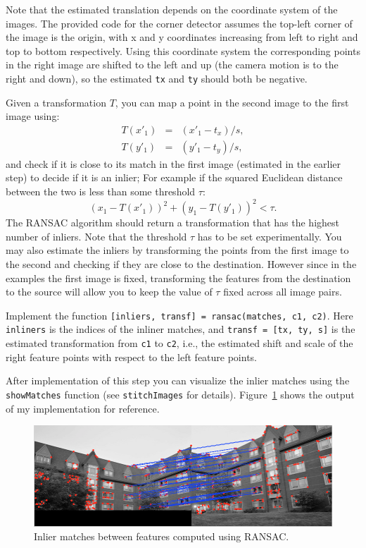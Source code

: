 \documentclass[10pt,letterpaper]{article}
\newcommand{\cmd}[1] {{\color{blue}\texttt{#1}}}
\begin{document}
Note that the estimated translation depends on the coordinate system of the images. The provided code for the corner detector assumes the top-left corner of the image is the origin, with x and y coordinates increasing from left to right and top to bottom respectively. Using this coordinate system the corresponding points in the right image are shifted to the left and up (the camera motion is to the right and down), so the estimated \cmd{tx} and \cmd{ty} should both be negative.

Given a transformation $T$, you can map a point in the second image to the first image using:
\begin{eqnarray}
T(x'_1) &=& (x'_1 - t_x)/s,\\
T(y'_1) &=& (y'_1 - t_y)/s,
\end{eqnarray}
and check if it is close to its match in the first image (estimated in the earlier step) to decide if it is an inlier; For example if the squared Euclidean distance between the two is less than some threshold $\tau$:
\begin{equation}
\left(x_1 - T(x'_1)\right)^2 + \left(y_1 - T(y'_1)\right)^2 < \tau.
\end{equation}
The RANSAC algorithm should return a transformation that has the highest number of inliers. Note that the threshold $\tau$ has to be set experimentally. You may also estimate the inliers by transforming the points from the first image to the second and checking if they are close to the destination. However since in the examples the first image is fixed, transforming the features from the destination to the source will allow you to keep the value of $\tau$ fixed across all image pairs. 

Implement the function \cmd{[inliers, transf] = ransac(matches, c1, c2)}. Here \cmd{inliners} is the indices of the inliner matches, and \cmd{transf = [tx, ty, s]} is the estimated transformation from \cmd{c1} to \cmd{c2}, i.e., the estimated shift and scale of the right feature points with respect to the left feature points.

After implementation of this step you can visualize the inlier matches using the \cmd{showMatches} function (see \cmd{stitchImages} for details). Figure~\ref{fig:inliers} shows the output of my implementation for reference.

\begin{figure}[h]
\centering
\includegraphics[width=0.9\linewidth]{inliers.png}
\vspace{-0.1in}
\caption{\label{fig:inliers}Inlier matches between features computed using RANSAC.}
\vspace{-0.1in}
\end{figure}
\end{document}
